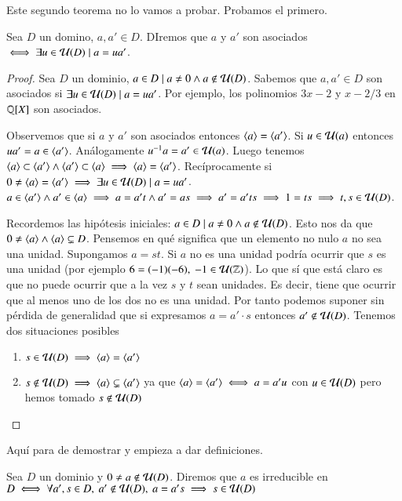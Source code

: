 Este segundo teorema no lo vamos a probar. Probamos el primero.

\begin{dfn}[Asociados]
	Sea $D$ un domino, $a,a' \in D$. DIremos que $a$ y $a'$ son asociados $\iff \exists u \in \mathcal{U}(D) \mid a = u a'$.
\end{dfn}

\begin{proof}
	Sea $D$ un dominio, $a \in D \mid a \neq 0 \land a \not\in \mathcal{U}(D)$. Sabemos que $a, a' \in D$ son asociados si $\exists u \in \mathcal{U}(D) \mid a = ua'$. Por ejemplo, los polinomios $3x-2$ y $x - 2/3$ en $\mathbb{Q}[X]$ son asociados.
	
	Observemos que si $a$ y $a'$ son asociados entonces $\langle a\rangle = \langle a'\rangle$. Si $u \in \mathcal{U}(a)$ entonces $ua' = a \in \langle a'\rangle$. Análogamente $u^{-1}a = a' \in \mathcal{U}(a)$. Luego tenemos $\langle a\rangle \subset \langle a'\rangle \land \langle a'\rangle \subset \langle a\rangle \implies \langle a\rangle = \langle a'\rangle$. Recíprocamente si $0 \neq \langle a\rangle = \langle a'\rangle \implies \exists u \in \mathcal{U}(D) \mid a = ua'$. $a \in \langle a'\rangle \land a' \in \langle a\rangle \implies a = a't \land a' = as \implies a' = a'ts \implies 1 = ts \implies t,s \in \mathcal{U}(D)$.
	
	Recordemos las hipótesis iniciales: $a \in D \mid a \neq 0 \land a \not\in \mathcal{U}(D)$. Esto nos da que $0 \neq \langle a\rangle \land \langle a\rangle \subsetneq D$. Pensemos en qué significa que un elemento no nulo $a$ no sea una unidad. Supongamos $a = st$. Si $a$ no es una unidad podría ocurrir que $s$ es una unidad (por ejemplo $6 = (-1)(-6),\ -1 \in \mathcal{U}(\mathbb{Z})$). Lo que sí que está claro es que no puede ocurrir que a la vez $s$ y $t$ sean unidades. Es decir, tiene que ocurrir que al menos uno de los dos no es una unidad. Por tanto podemos suponer sin pérdida de generalidad que si expresamos $a = a' \cdot s$  entonces $a' \not \in \mathcal{U}(D)$. Tenemos dos situaciones posibles
	\begin{enumerate}
		\item $s \in \mathcal{U}(D) \implies \langle a\rangle = \langle a'\rangle$
		\item $s \not \in \mathcal{U}(D) \implies \langle a\rangle \subsetneq \langle a'\rangle$ ya que $\langle a\rangle = \langle a'\rangle \iff a = a'u$ con $u \in \mathcal{U}(D)$ pero hemos tomado $s \not\in \mathcal{U}(D)$
	\end{enumerate}
\end{proof}

Aquí para de demostrar y empieza a dar definiciones.

\begin{dfn}[Irreducible]
	Sea $D$ un dominio y $0 \neq a \not\in \mathcal{U}(D)$. Diremos que $a$ es irreducible en $D \iff \forall a',s \in D,\ a' \not \in \uds{D},\ a = a's \implies s \in \uds{D}$
\end{dfn}

